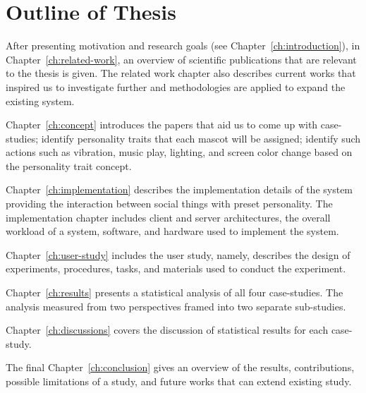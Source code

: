 \section{Outline of Thesis}
\label{sec:outline-of-thesis}
After presenting motivation and research goals (see Chapter~\ref{ch:introduction}), in Chapter~\ref{ch:related-work},
an overview of scientific publications that are relevant to the thesis is given.
The related work chapter also describes current works that inspired us to investigate further
and methodologies are applied to expand the existing system.

Chapter~\ref{ch:concept} introduces the papers that aid us to come up with case-studies;
identify personality traits that each mascot will be assigned;
identify such actions such as vibration, music play, lighting,
and screen color change based on the personality trait concept.

Chapter~\ref{ch:implementation} describes the implementation details of the system providing the
interaction between social things with preset personality.
The implementation chapter includes client and server architectures,
the overall workload of a system, software, and hardware used to implement the system.

Chapter~\ref{ch:user-study} includes the user study, namely, describes the design of
experiments, procedures, tasks, and materials used to conduct the experiment.

Chapter~\ref{ch:results} presents a statistical analysis of all four case-studies.
The analysis measured from two perspectives framed into two separate sub-studies.

Chapter~\ref{ch:discussions} covers the discussion of statistical results for each case-study.

The final Chapter~\ref{ch:conclusion} gives an overview of the results, contributions,
possible limitations of a study, and future works that can extend existing study.